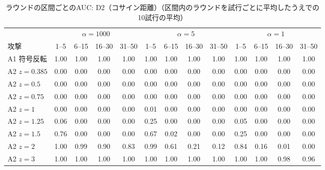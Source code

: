 \documentclass[a4j, twocolumn, dvipdfmx]{jsarticle}
\begin{document}
\begin{table}[H]
\centering
\caption{ラウンドの区間ごとのAUC: D2（コサイン距離）（区間内のラウンドを試行ごとに平均したうえでの10試行の平均）}
\label{tab:seg-d2}
\footnotesize
\tabcolsep=3.2pt
\begin{tabular}{@{}l@{\hspace{5pt}}cccc@{\hspace{8pt}}cccc@{\hspace{8pt}}cccc@{}}
\toprule
 & \multicolumn{4}{c}{$\alpha=1000$} & \multicolumn{4}{c}{$\alpha=5$} & \multicolumn{4}{c}{$\alpha=1$} \\
\cmidrule(lr){2-5}\cmidrule(lr){6-9}\cmidrule(l){10-13}
攻撃 & 1--5 & 6--15 & 16--30 & 31--50 & 1--5 & 6--15 & 16--30 & 31--50 & 1--5 & 6--15 & 16--30 & 31--50 \\
\midrule
A1 符号反転 & 1.00 & 1.00 & 1.00 & 1.00 & 1.00 & 1.00 & 1.00 & 1.00 & 1.00 & 1.00 & 1.00 & 1.00 \\
\midrule
A2 $z{=}0.385$ & 0.00 & 0.00 & 0.00 & 0.00 & 0.00 & 0.00 & 0.00 & 0.00 & 0.00 & 0.00 & 0.00 & 0.00 \\
A2 $z{=}0.5$ & 0.00 & 0.00 & 0.00 & 0.00 & 0.00 & 0.00 & 0.00 & 0.00 & 0.00 & 0.00 & 0.00 & 0.00 \\
A2 $z{=}0.75$ & 0.00 & 0.00 & 0.00 & 0.00 & 0.00 & 0.00 & 0.00 & 0.00 & 0.00 & 0.00 & 0.00 & 0.00 \\
A2 $z{=}1$ & 0.00 & 0.00 & 0.00 & 0.00 & 0.01 & 0.00 & 0.00 & 0.00 & 0.00 & 0.00 & 0.00 & 0.00 \\
A2 $z{=}1.25$ & 0.06 & 0.00 & 0.00 & 0.00 & 0.25 & 0.00 & 0.00 & 0.00 & 0.05 & 0.00 & 0.00 & 0.00 \\
A2 $z{=}1.5$ & 0.76 & 0.00 & 0.00 & 0.00 & 0.67 & 0.02 & 0.00 & 0.00 & 0.25 & 0.00 & 0.00 & 0.00 \\
A2 $z{=}2$ & 1.00 & 0.99 & 0.90 & 0.83 & 0.99 & 0.61 & 0.21 & 0.12 & 0.84 & 0.16 & 0.01 & 0.00 \\
A2 $z{=}3$ & 1.00 & 1.00 & 1.00 & 1.00 & 1.00 & 1.00 & 1.00 & 1.00 & 1.00 & 1.00 & 0.98 & 0.96 \\
\bottomrule
\end{tabular}
\end{table}
\end{document}
